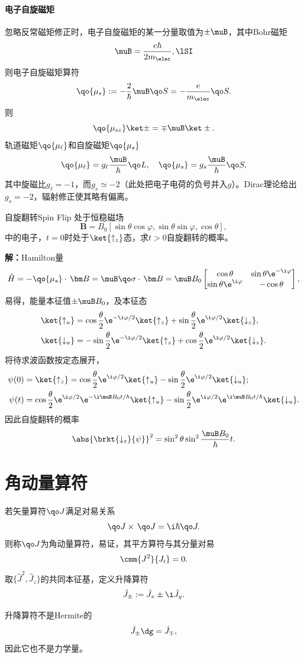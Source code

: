 \paragraph{电子自旋磁矩}忽略反常磁矩修正时，电子自旋磁矩的某一分量取值为$\pm\muB$，其中Bohr磁矩
\[
	\muB=\frac{e\hbar}{2m_\elec},\lSI
\]
则电子自旋磁矩算符
\[
	\qo{\mu_s}:=-\frac2\hbar\muB\qo S=-\frac e{m_\elec}\qo S.
\]
则
\[
	\qo{\mu_{sz}}\ket\pm=\mp\muB\ket\pm.
\]
轨道磁矩$\qo{\mu_\ell}$和自旋磁矩$\qo{\mu_s}$
\[
	\qo{\mu_\ell}=g_\ell\frac\muB\hbar\qo L,\quad\qo{\mu_s}=g_s\frac\muB\hbar\qo S,
\]
其中旋磁比$g_\ell=-1$，而$g_s\simeq-2$（此处把电子电荷的负号并入$g$）。Dirac理论给出$g_s=-2$，辐射修正使其略有偏离。
\begin{example}{自旋翻转}{Spin Flip}
	处于恒稳磁场
	\[
		\bm B=B_0[\sin\theta\cos\varphi,\sin\theta\sin\varphi,\cos\theta],
\]
	中的电子，$t=0$时处于$\ket{\uparrow_z}$态，求$t>0$自旋翻转的概率。
	
	\textbf{解：}\quad Hamilton量
	\[
		\hat H=-\qo{\mu_s}\cdot\,\bm B=\muB\qo\sigma\cdot\,\bm B=\muB B_0\begin{bmatrix}
		\cos\theta&\sin\theta\e^{-\i\varphi}\\\sin\theta\e^{\i\varphi}&-\cos\theta
	\end{bmatrix},
\]
	易得，能量本征值$\pm\muB B_0$，及本征态
	\begin{align*}
		\ket{\uparrow_u}&=\cos\frac\theta{2}\e^{-\i\varphi/2}\ket{\uparrow_z}+\sin\frac\theta{2}\e^{\i\varphi/2}\ket{\downarrow_z},\\
		\ket{\downarrow_u}&=-\sin\frac\theta{2}\e^{-\i\varphi/2}\ket{\uparrow_z}+\cos\frac\theta{2}\e^{\i\varphi/2}\ket{\downarrow_z}.
	\end{align*}
	将待求波函数按定态展开，
	\begin{align*}
		\psi(0)&=\ket{\uparrow_z}=\cos\frac\theta{2}\e^{\i\varphi/2}\ket{\uparrow_u}-\sin\frac\theta{2}\e^{\i\varphi/2}\ket{\downarrow_u};\\
		\psi(t)&=\cos\frac\theta{2}\e^{\i\varphi/2}\e^{-\i\muB B_0t/\hbar}\ket{\uparrow_u}-\sin\frac\theta{2}\e^{\i\varphi/2}\e^{\i\muB B_0t/\hbar}\ket{\downarrow_u}.
	\end{align*}
	因此自旋翻转的概率
	\[
		\abs{\brkt{\downarrow_z}{\psi}}^2=\sin^2\theta\sin^2\frac{\muB B_0}\hbar t.
\]
\end{example}
\section{角动量算符}
若矢量算符$\qo J$满足对易关系
\[
	\qo J\times\,\qo J=\i\hbar\qo J.
\]
则称$\qo J$为角动量算符，易证，其平方算符与其分量对易
\[
	\cmm {J^2}{J_i}=0.
\]
取$\{\hat J^2,\hat J_z\}$的共同本征基，定义升降算符
\begin{align}
	\hat J_\pm:=\hat J_x\pm\i\hat J_y.
\end{align}
\begin{remark}
	升降算符不是Hermite的
	\[
		\hat J_\pm\dg=\hat J_\mp,
	\]
	因此它也不是力学量。
\end{remark}

